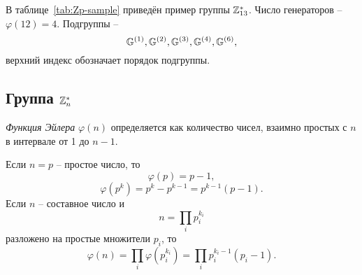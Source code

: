 \example
В таблице~\ref{tab:Zp-sample} приведён пример группы $\mathbb{Z}_{13}^*$. Число генераторов -- $\varphi(12) = 4$. Подгруппы --
    \[ \mathbb{G}^{(1)}, \mathbb{G}^{(2)}, \mathbb{G}^{(3)}, \mathbb{G}^{(4)}, \mathbb{G}^{(6)}, \]
верхний индекс обозначает порядок подгруппы.

\begin{table}[!ht]
    \centering
    \caption {Генераторы и циклические подгруппы группы $\Gr=\Z_{13}^*$\label{tab:Zp-sample}}
\end{table}
\exampleend


\subsection{Группа $\mathbb{Z}_n^*$}

\emph{Функция Эйлера} $\varphi(n)$ определяется как количество чисел, взаимно простых с $n$ в интервале от 1 до $n-1$.

Если $n=p$ -- простое число, то
    \[ \varphi(p) = p - 1, \]
    \[ \varphi(p^k) = p^k - p^{k-1} = p^{k-1}(p - 1). \]
Если $n$ -- составное число и
    \[ n = \prod \limits_{i} p_i^{k_i} \]
разложено на простые множители $p_i$, то
    \[ \varphi(n) = \prod \limits_{i} \varphi(p_i^{k_i}) =  \prod \limits_{i} p_i^{k_i - 1}(p_i - 1). \]

